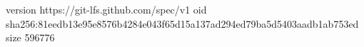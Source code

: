 version https://git-lfs.github.com/spec/v1
oid sha256:81eedb13e95e8576b4284e043f65d15a137ad294ed79ba5d5403aadb1ab753ed
size 596776

